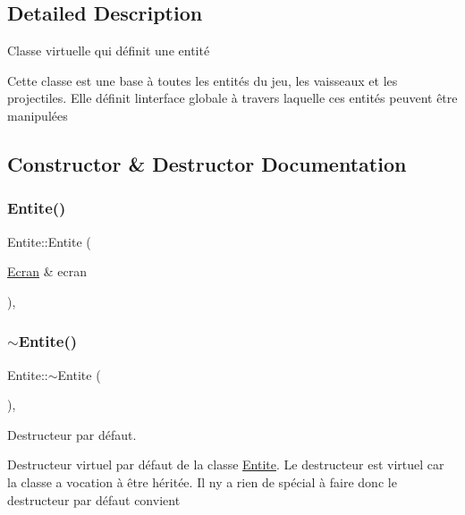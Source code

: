 \subsection{Detailed Description}
Classe virtuelle qui définit une entité 

Cette classe est une base à toutes les entités du jeu, les vaisseaux et les projectiles. Elle définit l\textquotesingle{}interface globale à travers laquelle ces entités peuvent être manipulées 

\subsection{Constructor \& Destructor Documentation}
\mbox{\label{class_entite_a144da7dfc4ebff745b901e75c6167857}} 
\subsubsection{\texorpdfstring{Entite()}{Entite()}}
{\footnotesize\ttfamily Entite\+::\+Entite (\begin{DoxyParamCaption}\item[{\mbox{\hyperlink{class_ecran}{Ecran}} \&}]{ecran }\end{DoxyParamCaption})\hspace{0.3cm}{\ttfamily [inline]}, {\ttfamily [explicit]}}

\mbox{\label{class_entite_a8084762a25afbfbcdca31121a3dfcd87}} 
\subsubsection{\texorpdfstring{$\sim$\+Entite()}{~Entite()}}
{\footnotesize\ttfamily Entite\+::$\sim$\+Entite (\begin{DoxyParamCaption}{ }\end{DoxyParamCaption})\hspace{0.3cm}{\ttfamily [virtual]}, {\ttfamily [default]}}



Destructeur par défaut. 

Destructeur virtuel par défaut de la classe \mbox{\hyperlink{class_entite}{Entite}}. Le destructeur est virtuel car la classe a vocation à être héritée. Il n\textquotesingle{}y a rien de spécial à faire donc le destructeur par défaut convient 

